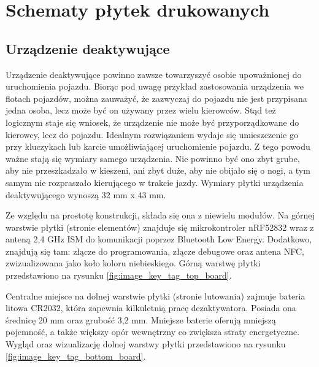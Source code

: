 \chapter{Schematy płytek drukowanych}
\label{boards}

\section{Urządzenie deaktywujące}

Urządzenie deaktywujące powinno zawsze towarzyszyć osobie upoważnionej do uruchomienia pojazdu. Biorąc pod uwagę przykład zastosowania urządzenia we flotach pojazdów, można zauważyć, że zazwyczaj do pojazdu nie jest przypisana jedna osoba, lecz może być on używany przez wielu kierowców. Stąd też logicznym staje się wniosek, że urządzenie nie może być przyporządkowane do kierowcy, lecz do pojazdu. Idealnym rozwiązaniem wydaje się umieszczenie go przy kluczykach lub karcie umożliwiającej uruchomienie pojazdu. Z tego powodu ważne stają się wymiary samego urządzenia. Nie powinno być ono zbyt grube, aby nie przeszkadzało w kieszeni, ani zbyt duże, aby nie obijało się o nogi, a tym samym nie rozpraszało kierującego w trakcie jazdy.
Wymiary płytki urządzenia deaktywującego wynoszą 32 mm x 43 mm.

Ze względu na prostotę konstrukcji, składa się ona z niewielu modułów. Na górnej warstwie płytki (stronie elementów) znajduje się mikrokontroler nRF52832 wraz z anteną 2,4 GHz ISM do komunikacji poprzez Bluetooth Low Energy. Dodatkowo, znajdują się tam: złącze do programowania, złącze debugowe oraz antena NFC, zwizualizowana jako koło koloru niebieskiego. Górną warstwę płytki przedstawiono na rysunku \ref{fig:image_key_tag_top_board}.

Centralne miejsce na dolnej warstwie płytki (stronie lutowania) zajmuje bateria litowa CR2032, która zapewnia kilkuletnią pracę dezaktywatora. Posiada ona średnicę 20 mm oraz grubość 3,2 mm. Mniejsze baterie oferują mniejszą pojemność, a także większy opór wewnętrzny co zwiększa straty energetyczne. Wygląd oraz wizualizację dolnej warstwy płytki przedstawiono na rysunku \ref{fig:image_key_tag_bottom_board}.

